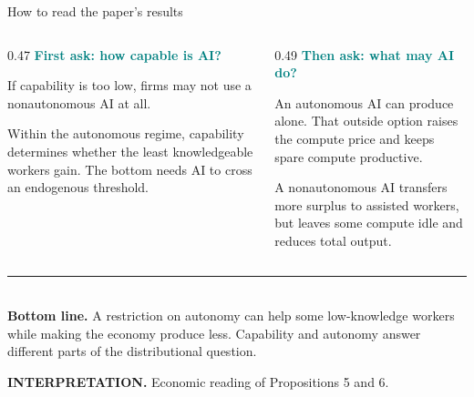 \documentclass[aspectratio=169,11pt]{beamer}
\newcommand{\key}[1]{\textcolor{Teal}{\textbf{#1}}}
\newcommand{\interpretationfoot}{\scriptsize\color{Muted}\textbf{INTERPRETATION.} Economic reading of Propositions 5 and 6.}
\begin{document}
\begin{frame}{How to read the paper's results}
\small
\begin{columns}[T,totalwidth=\textwidth]
\begin{column}{0.47\textwidth}
  \key{First ask: how capable is AI?}

  If capability is too low, firms may not use a nonautonomous AI at all.

  \vspace{0.22cm}
  Within the autonomous regime, capability determines whether the least
  knowledgeable workers gain. The bottom needs AI to cross an endogenous
  threshold.
\end{column}
\begin{column}{0.49\textwidth}
  \key{Then ask: what may AI do?}

  An autonomous AI can produce alone. That outside option raises the compute
  price and keeps spare compute productive.

  \vspace{0.22cm}
  A nonautonomous AI transfers more surplus to assisted workers, but leaves
  some compute idle and reduces total output.
\end{column}
\end{columns}

\vfill
{\color{Coral}\rule{\textwidth}{0.8pt}}\\[-0.02cm]
\textbf{Bottom line.} A restriction on autonomy can help some low-knowledge
workers while making the economy produce less. Capability and autonomy answer
different parts of the distributional question.

\vspace{0.08cm}
\interpretationfoot
\end{frame}
\end{document}
